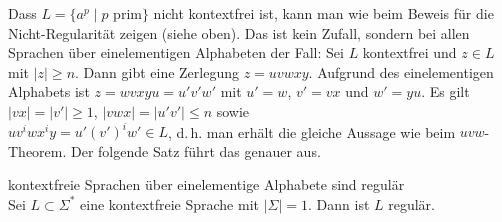 \begin{Bsp}
    Dass $L = \{a^p \;|\; p \text{ prim}\}$ nicht kontextfrei ist, kann man
    wie beim Beweis für die Nicht-Regularität zeigen (siehe oben).
    Das ist kein Zufall, sondern bei allen Sprachen über einelementigen
    Alphabeten der Fall:
    Sei $L$ kontextfrei und $z \in L$ mit $|z| \ge n$.
    Dann gibt eine Zerlegung $z = uvwxy$.
    Aufgrund des einelementigen Alphabets ist $z = wvxyu = u'v'w'$ mit
    $u' = w$, $v' = vx$ und $w' = yu$.
    Es gilt $|vx| = |v'| \ge 1$,
    $|vwx| = |u'v'| \le n$ sowie\\
    $uv^i wx^i y = u' (v')^i w' \in L$, d.\,h. man erhält die gleiche Aussage
    wie beim $uvw$-Theorem.
    Der folgende Satz führt das genauer aus.
\end{Bsp}

\begin{Satz}{kontextfreie Sprachen über einelementige Alphabete sind regulär}\\
    Sei $L \subset \Sigma^\ast$ eine kontextfreie Sprache mit $|\Sigma| = 1$.
    Dann ist $L$ regulär.
\end{Satz}

